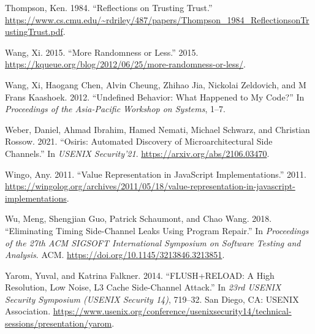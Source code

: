 \documentclass[
  a4paper,
]{report}
\newlength{\cslhangindent}
\newlength{\cslentryspacingunit} %
\newenvironment{CSLReferences}[2] %
 {%
  \setlength{\parindent}{0pt}
  \ifodd #1
  \let\oldpar\par
  \def\par{\hangindent=\cslhangindent\oldpar}
  \fi
  \setlength{\parskip}{#2\cslentryspacingunit}
 }%
 {}
\begin{document}
\begin{CSLReferences}{1}{0}
\leavevmode{}%
Thompson, Ken. 1984. {``Reflections on Trusting Trust.''}
\url{https://www.cs.cmu.edu/~rdriley/487/papers/Thompson_1984_ReflectionsonTrustingTrust.pdf}.

\leavevmode{}%
Wang, Xi. 2015. {``More Randomness or Less.''} 2015.
\url{https://kqueue.org/blog/2012/06/25/more-randomness-or-less/}.

\leavevmode{}%
Wang, Xi, Haogang Chen, Alvin Cheung, Zhihao Jia, Nickolai Zeldovich,
and M Frans Kaashoek. 2012. {``Undefined Behavior: What Happened to My
Code?''} In \emph{Proceedings of the Asia-Pacific Workshop on Systems},
1--7.

\leavevmode{}%
Weber, Daniel, Ahmad Ibrahim, Hamed Nemati, Michael Schwarz, and
Christian Rossow. 2021. {``Osiris: Automated Discovery of
Microarchitectural Side Channels.''} In \emph{USENIX Security'21}.
\url{https://arxiv.org/abs/2106.03470}.

\leavevmode{}%
Wingo, Any. 2011. {``Value Representation in JavaScript
Implementations.''} 2011.
\url{https://wingolog.org/archives/2011/05/18/value-representation-in-javascript-implementations}.

\leavevmode{}%
Wu, Meng, Shengjian Guo, Patrick Schaumont, and Chao Wang. 2018.
{``Eliminating Timing Side-Channel Leaks Using Program Repair.''} In
\emph{Proceedings of the 27th {ACM} {SIGSOFT} International Symposium on
Software Testing and Analysis}. {ACM}.
\url{https://doi.org/10.1145/3213846.3213851}.

\leavevmode{}%
Yarom, Yuval, and Katrina Falkner. 2014. {``{FLUSH+RELOAD}: A High
Resolution, Low Noise, L3 Cache {Side-Channel} Attack.''} In \emph{23rd
USENIX Security Symposium (USENIX Security 14)}, 719--32. San Diego, CA:
USENIX Association.
\url{https://www.usenix.org/conference/usenixsecurity14/technical-sessions/presentation/yarom}.

\end{CSLReferences}
\end{document}
